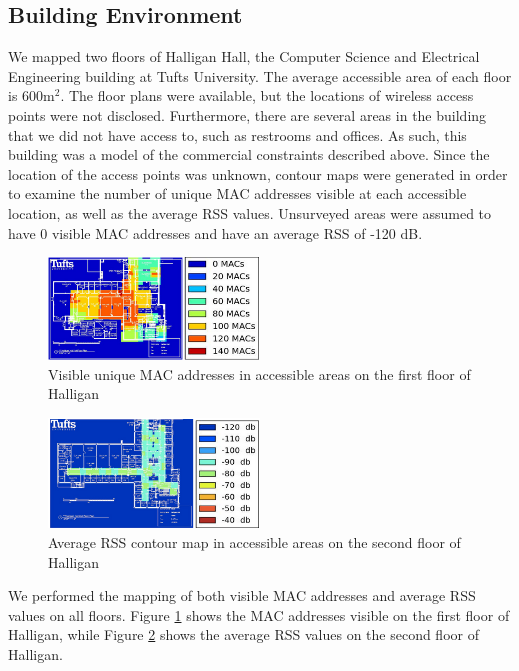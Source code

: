 \documentclass[conference]{IEEEtran}
\begin{document}
\subsection{Building Environment}
We mapped two floors of Halligan Hall, the Computer Science and Electrical Engineering building at Tufts University. The average accessible area of each floor is 600m$^2$. The floor plans were available, but the locations of wireless access points were not disclosed. Furthermore, there are several areas in the building that we did not have access to, such as restrooms and offices. As such, this building was a model of the commercial constraints described above. Since the location of the access points was unknown, contour maps were generated in order to examine the number of unique MAC addresses visible at each accessible location, as well as the average RSS values. Unsurveyed areas were assumed to have 0 visible MAC addresses and have an average RSS of -120 dB. 
 
\begin{figure}[h!]
  \centering
    \includegraphics[width=0.5\textwidth]{APContour}
    \caption{Visible unique MAC addresses in accessible areas on the first floor of Halligan}
    \label{fig:visible_unique_macs}
\end{figure}


\begin{figure}[h!]
  \centering
    \includegraphics[width=0.5\textwidth]{dbContour}
   \caption{Average RSS contour map in accessible areas on the second floor of Halligan}
   \label{fig:rss_contour_map}
\end{figure}

We performed the mapping of both visible MAC addresses and average RSS values on all floors. Figure \ref{fig:visible_unique_macs} shows the MAC addresses visible on the first floor of Halligan, while Figure \ref{fig:rss_contour_map} shows the average RSS values on the second floor of Halligan.
\end{document}
